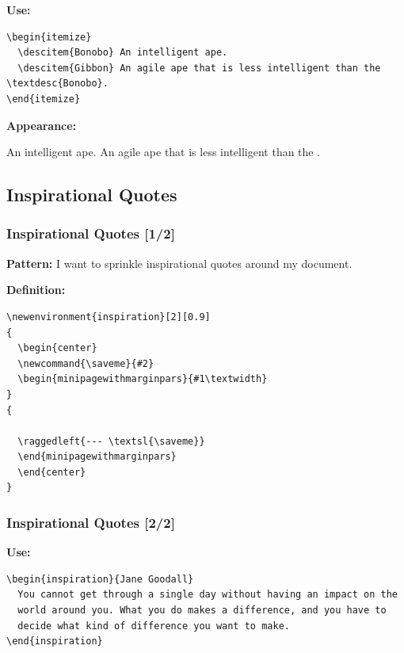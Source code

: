 {\begin{frame}[fragile]
  
  \vspace{-1mm}
  \textbf{Use:}
  \begin{verbatim}
\begin{itemize}
  \descitem{Bonobo} An intelligent ape.
  \descitem{Gibbon} An agile ape that is less intelligent than the \textdesc{Bonobo}.
\end{itemize}
  \end{verbatim}
  
  \pause
  \vspace{2mm}
  \textbf{Appearance:}
  \begin{itemize}
     An intelligent ape.
     An agile ape that is less intelligent than the .
  \end{itemize}
\end{frame}

\subsection{Inspirational Quotes}
\begin{frame}[fragile]
  \frametitle{Inspirational Quotes [1/2]}
  \vspace{3mm}
  \textbf{Pattern:} I want to sprinkle inspirational quotes around my document.
  
  \pause
  \vspace{5mm}
  \textbf{Definition:}
  \begin{verbatim}
\newenvironment{inspiration}[2][0.9]
{
  \begin{center}
  \newcommand{\saveme}{#2}
  \begin{minipagewithmarginpars}{#1\textwidth}
}
{
  
  \raggedleft{--- \textsl{\saveme}}
  \end{minipagewithmarginpars}
  \end{center}
}
  \end{verbatim}
\end{frame}
\begin{frame}[fragile]
  \frametitle{Inspirational Quotes [2/2]}
  \vspace{3mm}
  \textbf{Use:}
  \begin{verbatim}
\begin{inspiration}{Jane Goodall}
  You cannot get through a single day without having an impact on the
  world around you. What you do makes a difference, and you have to
  decide what kind of difference you want to make.
\end{inspiration}
  \end{verbatim}
  

\end{frame}}
